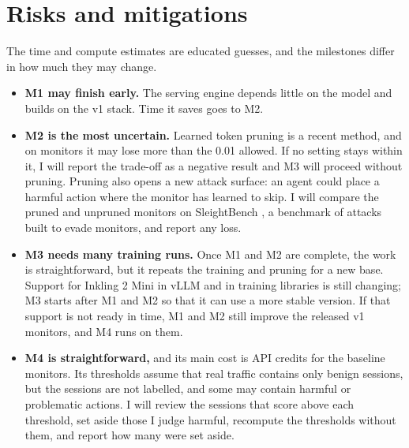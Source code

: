 \section{Risks and mitigations}
\label{sec:risks}
The time and compute estimates are educated guesses, and the milestones
differ in how much they may change.

\begin{itemize}
    \item \textbf{M1 may finish early.} The serving engine depends little on
    the model and builds on the v1 stack. Time it saves goes to M2.
    \item \textbf{M2 is the most uncertain.} Learned token pruning is a
    recent method, and on monitors it may lose more than the 0.01 allowed.
    If no setting stays within it, I will report the trade-off as a negative
    result and M3 will proceed without pruning. Pruning also opens a new attack
    surface: an agent could place a harmful action where the monitor has
    learned to skip. I will compare the pruned and unpruned monitors on
    SleightBench \citep{najt2026sleight}, a benchmark of attacks built to evade
    monitors, and report any loss.
    \item \textbf{M3 needs many training runs.} Once M1 and M2 are complete,
    the work is straightforward, but it repeats the training and pruning for
    a new base. Support for Inkling 2 Mini in vLLM and in training
    libraries is still changing; M3 starts after
    M1 and M2 so that it can use a more stable version. If
    that support is not ready in time, M1 and M2 still improve the released
    v1 monitors, and M4 runs on them.
    \item \textbf{M4 is straightforward,} and its main cost is API credits
    for the baseline monitors. Its
    thresholds assume that real traffic contains only benign sessions, but the
    sessions are not labelled, and some may contain harmful or problematic
    actions. I will review the sessions that score above each threshold, set
    aside those I judge harmful, recompute the thresholds without them, and
    report how many were set aside.
\end{itemize}
